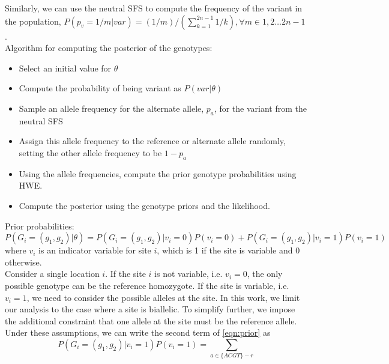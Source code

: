 \documentclass[12pt]{article}
\begin{document}
Similarly, we can use the neutral SFS to compute the frequency of the variant in the population, $P(p_v = 1/m | var) = (1/m)/(\sum_{k=1}^{2n-1}1/k), \forall m \in {1,2 \dots 2n-1}$.\\
Algorithm for computing the posterior of the genotypes:
\begin{itemize}
\item Select an initial value for $\theta$
\item Compute the probability of being variant as $P(var|\theta)$
\item Sample an allele frequency for the alternate allele, $p_a$, for the variant from the neutral SFS
\item Assign this allele frequency to the reference or alternate allele randomly, setting the other allele frequency to be $1-p_a$
\item Using the allele frequencies, compute the prior genotype probabilities using HWE.
\item Compute the posterior using the genotype priors and the likelihood. 
\end{itemize}

\newpage
Prior probabilities:\\
\begin{equation}
P(G_i = (g_1,g_2)|\theta) = P(G_i=(g_1,g_2)|v_i=0)P(v_i=0) + P(G_i=(g_1,g_2)|v_i=1)P(v_i=1)
\label{eqn:prior}
\end{equation}
where $v_i$ is an indicator variable for site $i$, which is 1 if the site is variable and 0 otherwise.\\
Consider a single location $i$. If the site $i$ is not variable, i.e. $v_i = 0$, the only possible genotype can be the reference homozygote. If the site is variable, i.e. $v_i=1$, we need to consider the possible alleles at the site. In this work, we limit our analysis to the case where a site is biallelic. To simplify further, we impose the additional constraint that one allele at the site must be the reference allele. Under these assumptions, we can write the second term of \ref{eqn:prior} as
\begin{equation}
P(G_i =(g_1,g_2)|v_i=1)P(v_i=1) = \sum_{a\in \{ACGT\}-r}
\end{equation}
\end{document}
